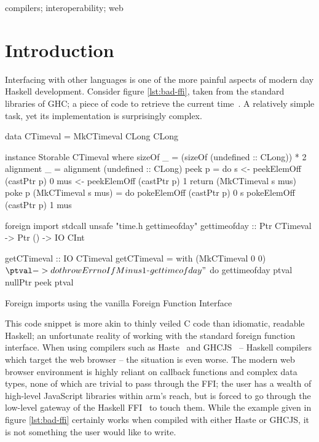 \documentclass[preprint]{sigplanconf}
\begin{document}

%
\keywords
compilers; interoperability; web

\section{Introduction}\label{sec:intro}
Interfacing with other languages is one of the more painful aspects of modern
day Haskell development. Consider figure \ref{lst:bad-ffi}, taken from the
standard libraries of GHC; a piece of code to retrieve the
current time\ \cite{time}. A relatively simple task, yet its implementation is
surprisingly complex.

\begin{listingfloat}
\begin{code}
data CTimeval = MkCTimeval CLong CLong

instance Storable CTimeval where
	sizeOf _ = (sizeOf (undefined :: CLong)) * 2
	alignment _ = alignment (undefined :: CLong)
	peek p = do
		s   <- peekElemOff (castPtr p) 0
		mus <- peekElemOff (castPtr p) 1
		return (MkCTimeval s mus)
	poke p (MkCTimeval s mus) = do
		pokeElemOff (castPtr p) 0 s
		pokeElemOff (castPtr p) 1 mus

foreign import stdcall unsafe "time.h gettimeofday"
   gettimeofday :: Ptr CTimeval -> Ptr () -> IO CInt

getCTimeval :: IO CTimeval
getCTimeval = with (MkCTimeval 0 0) $ \ptval -> do
  throwErrnoIfMinus1_ "gettimeofday" $ do
    gettimeofday ptval nullPtr
  peek ptval
\end{code}
\caption{Foreign imports using the vanilla Foreign Function Interface}
\label{lst:bad-ffi}
\end{listingfloat}

This code snippet is more akin to thinly veiled C code than idiomatic, readable
Haskell; an unfortunate reality of working with the standard foreign function
interface. When using compilers such as Haste\ \cite{haste} and
GHCJS\ \cite{ghcjs} -- Haskell compilers which target the web browser -- the
situation is even worse.
The modern web browser environment is highly reliant on callback functions and
complex data types, none of which are trivial to pass through the FFI;
the user has a wealth of high-level JavaScript libraries within arm's reach,
but is forced to go through the low-level gateway of
the Haskell FFI\ \cite{ffi} to touch them.
While the example given in figure \ref{lst:bad-ffi} certainly works when
compiled with either Haste or GHCJS, it is not something the user would like
to write.
\end{document}
